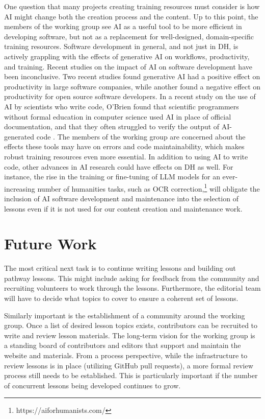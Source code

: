 \documentclass[final]{anthology-ch} %
\begin{document}
One question that many projects creating training resources must consider is how AI might change both the creation process and the content. Up to this point, the members of the working group see AI as a useful tool to be more efficient in developing software, but not as a replacement for well-designed, domain-specific training resources. Software development in general, and not just in DH, is actively grappling with the effects of generative AI on workflows, productivity, and training. Recent studies on the impact of AI on software development have been inconclusive. Two recent studies \cite{coutinho2024, cui2025} found generative AI had a positive effect on productivity in large software companies, while another \cite{becker2025} found a negative effect on productivity for open source software developers. In a recent study on the use of AI by scientists who write code, O'Brien found that scientific programmers without formal education in computer science used AI in place of official documentation, and that they often struggled to verify the output of AI-generated code \cite{obrien2025}. The members of the working group are concerned about the effects these tools may have on errors and code maintainability, which makes robust training resources even more essential. In addition to using AI to write code, other advances in AI research could have effects on DH as well. For instance, the rise in the training or fine-tuning of LLM models for an ever-increasing number of humanities tasks, such as OCR correction,\footnote{https://aiforhumanists.com/
} will obligate the inclusion of AI software development and maintenance into the selection of lessons even if it is not used for our content creation and maintenance work.


\section{Future Work}

The most critical next task is to continue writing lessons and building out pathway lessons. This might include asking for feedback from the community and recruiting volunteers to work through the lessons. Furthermore, the editorial team will have to decide what topics to cover to ensure a coherent set of lessons.

Similarly important is the establishment of a community around the working group. Once a list of desired lesson topics exists, contributors can be recruited to write and review lesson materials. The long-term vision for the working group is a standing board of contributors and editors that support and maintain the website and materials. From a process perspective, while the infrastructure to review lessons is in place (utilizing GitHub pull requests), a more formal review process still needs to be established. This is particularly important if the number of concurrent lessons being developed continues to grow.
\end{document}
